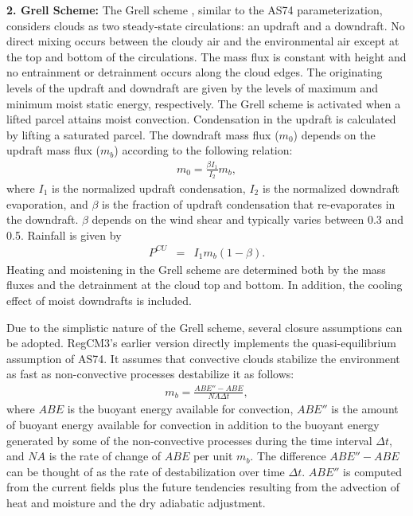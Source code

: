 \noindent
{\bf 2.  Grell Scheme:}    The Grell scheme \cite{Grell_93}, similar to the AS74 parameterization,
considers clouds as two steady-state circulations: an updraft and a
downdraft. No direct mixing occurs between the cloudy air and the
environmental air except at the top and bottom of the
circulations. The mass flux is constant with height and no entrainment
or detrainment occurs along the cloud edges. The originating levels of
the updraft and downdraft are given by the levels of maximum and
minimum moist static energy, respectively. The Grell scheme is
activated when a lifted parcel attains moist convection. Condensation
in the updraft is calculated by lifting a saturated parcel. The
downdraft mass flux ($m_0$) depends on the updraft mass flux ($m_b$)
according to the following relation:
\begin{eqnarray}
m_0=\frac{\beta I_1}{I_2}m_b,
\end{eqnarray}
where $I_1$ is the normalized updraft condensation, $I_2$ is the
normalized downdraft evaporation, and $\beta$ is the fraction of
updraft condensation that re-evaporates in the downdraft. $\beta$
depends on the wind shear and typically varies between 0.3 and
0.5. Rainfall is given by
\begin{eqnarray}
P^{CU}&=&I_1m_b(1-\beta).
\label{eqn_model:GCCppt}
\end{eqnarray}
Heating and moistening in the Grell scheme are determined both
by the mass fluxes and the detrainment at the cloud top and
bottom. In addition, the cooling effect of moist downdrafts is
included.

Due to the simplistic nature of the Grell scheme, several closure
assumptions can be adopted. RegCM3's earlier version directly
implements the quasi-equilibrium assumption of AS74. It
assumes that convective clouds stabilize the environment as fast as
non-convective processes destabilize it as follows:
\begin{eqnarray}
m_b=\frac{ABE''-ABE}{NA\Delta t},
\label{eqn_model:closureAS}
\end{eqnarray}
where $ABE$ is the buoyant energy available for convection, $ABE''$ is
the amount of buoyant energy available for convection in addition to
the buoyant energy generated by some of the non-convective processes
during the time interval $\Delta t$, and $NA$ is the rate of change of
$ABE$ per unit $m_b$. The difference $ABE''-ABE$ can be thought of as
the rate of destabilization over time $\Delta t$. $ABE''$ is computed
from the current fields plus the future tendencies resulting from the
advection of heat and moisture and the dry adiabatic adjustment.

